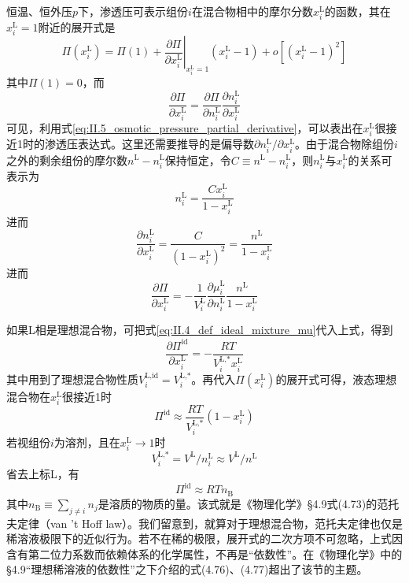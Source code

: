 \documentclass[main.tex]{subfiles}
\begin{document}
恒温、恒外压$p$下，渗透压可表示组份$i$在混合物相中的摩尔分数$x_i^\text{L}$的函数，其在$x_i^\text{L}=1$附近的展开式是
\[\Pi\left(x_i^\text{L}\right)=\Pi\left(1\right)+\left.\frac{\partial\Pi}{\partial x_i^\text{L}}\right|_{x_i^\text{L}=1}\left(x_i^\text{L}-1\right)+o\left[\left(x_i^\text{L}-1\right)^2\right]\]
其中$\Pi\left(1\right)=0$，而
\[\frac{\partial \Pi}{\partial x_i^\text{L}}=\frac{\partial\Pi}{\partial n_i^\text{L}}\frac{\partial n_i^\text{L}}{\partial x_i^\text{L}}\]
可见，利用式\eqref{eq:II.5_osmotic_pressure_partial_derivative}，可以表出在$x_i^\text{L}$很接近1时的渗透压表达式。这里还需要推导的是偏导数$\partial n_i^\text{L}/\partial x_i^\text{L}$。由于混合物除组份$i$之外的剩余组份的摩尔数$n^\text{L}-n_i^\text{L}$保持恒定，令$C\equiv n^\text{L}-n_i^\text{L}$，则$n_i^\text{L}$与$x_i^\text{L}$的关系可表示为
\[n_i^\text{L}=\frac{Cx_i^\text{L}}{1-x_i^\text{L}}\]
进而
\[\frac{\partial n_i^\text{L}}{\partial x_i^\text{L}}=\frac{C}{\left(1-x_i^\text{L}\right)^2}=\frac{n^\text{L}}{1-x_i^\text{L}}\]
进而
\[\frac{\partial \Pi}{\partial x_i^\text{L}}=-\frac{1}{V_i^\text{L}}\frac{\partial\mu_i^\text{L}}{\partial n_i^\text{L}}\frac{n^\text{L}}{1-x_i^\text{L}}\]

如果L相是理想混合物，可把式\eqref{eq:II.4_def_ideal_mixture_mu}代入上式，得到
\[\frac{\partial \Pi^\text{id}}{\partial x_i^\text{L}}=-\frac{RT}{V_i^\text{L,*}x_i^\text{L}}\]
其中用到了理想混合物性质$V_i^\text{L,id}=V_i^\text{L,*}$。再代入$\Pi\left(x_i^\text{L}\right)$的展开式可得，液态理想混合物在$x_i^\text{L}$很接近1时
\[\Pi^\text{id}\approx\frac{RT}{V_i^\text{L,*}}\left(1-x_i^\text{L}\right)\]
若视组份$i$为溶剂，且在$x_i^\text{L}\rightarrow 1$时
\[V_i^\text{L,*}=V^\text{L}/n_i^\text{L}\approx V^\text{L}/n^\text{L}\]
省去上标L，有
\[\Pi^\text{id}\approx RTn_\text{B}\]
其中$n_\text{B}\equiv\sum_{j\neq i}n_j$是溶质的物质的量。该式就是《物理化学》\S4.9式(4.73)的范托夫定律（van 't Hoff law）。我们留意到，就算对于理想混合物，范托夫定律也仅是稀溶液极限下的近似行为。若不在稀的极限，展开式的二次方项不可忽略，上式因含有第二位力系数而依赖体系的化学属性，不再是“依数性”。在《物理化学》中的\S4.9“理想稀溶液的依数性”之下介绍的式(4.76)、(4.77)超出了该节的主题。
\end{document}
